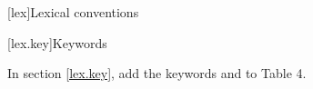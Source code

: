 
[lex]{Lexical conventions}

[lex.key]{Keywords}

In section \ref{lex.key}, add the keywords  and
 to Table 4.

